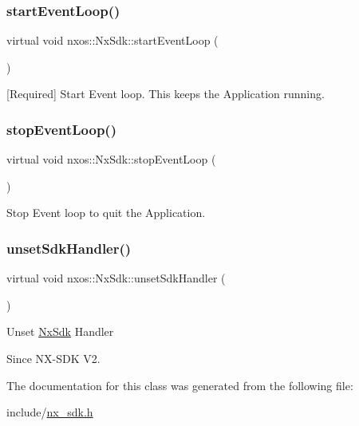 \subsubsection{\texorpdfstring{start\+Event\+Loop()}{startEventLoop()}}
{\footnotesize\ttfamily virtual void nxos\+::\+Nx\+Sdk\+::start\+Event\+Loop (\begin{DoxyParamCaption}{ }\end{DoxyParamCaption})\hspace{0.3cm}{\ttfamily [pure virtual]}}

\mbox{[}Required\mbox{]} Start Event loop. This keeps the Application running. \mbox{\label{classnxos_1_1_nx_sdk_adc80e6f244a7cbc050f9dacbc8018315}} 
\subsubsection{\texorpdfstring{stop\+Event\+Loop()}{stopEventLoop()}}
{\footnotesize\ttfamily virtual void nxos\+::\+Nx\+Sdk\+::stop\+Event\+Loop (\begin{DoxyParamCaption}{ }\end{DoxyParamCaption})\hspace{0.3cm}{\ttfamily [pure virtual]}}

Stop Event loop to quit the Application. \mbox{\label{classnxos_1_1_nx_sdk_ad86348d2475862e149dcdbe04634db3b}} 
\subsubsection{\texorpdfstring{unset\+Sdk\+Handler()}{unsetSdkHandler()}}
{\footnotesize\ttfamily virtual void nxos\+::\+Nx\+Sdk\+::unset\+Sdk\+Handler (\begin{DoxyParamCaption}{ }\end{DoxyParamCaption})\hspace{0.3cm}{\ttfamily [pure virtual]}}

Unset \mbox{\hyperlink{classnxos_1_1_nx_sdk}{Nx\+Sdk}} Handler

\begin{DoxySince}{Since}
N\+X-\/\+S\+DK V2. 
\end{DoxySince}


The documentation for this class was generated from the following file\+:\begin{DoxyCompactItemize}
\item 
include/\mbox{\hyperlink{nx__sdk_8h}{nx\+\_\+sdk.\+h}}\end{DoxyCompactItemize}
